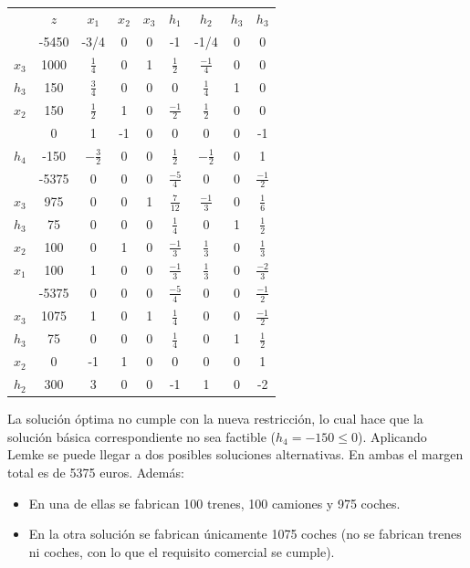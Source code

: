 \begin{enumerate}
    \begin{center}
    \begin{tabular}{c|c|ccccccc|}
      & $z$ & $x_1$ & $x_2$ & $x_3$ & $h_1$ & $h_2$ & $h_3$ & $h_3$\\ 
      & -5450 & -3/4 & 0 & 0 & -1 & -1/4 & 0 & 0\\ 
    \hline
    $x_3$ & 1000  & $\frac{1}{4}$ & 0 & 1 & $\frac{1}{2}$ & $\frac{-1}{4}$ & 0 & 0 \\ 
    $h_3$ & 150  & $\frac{3}{4}$ & 0 & 0 & 0 & $\frac{1}{4}$ & 1 & 0\\ 
    $x_2$ & 150  & $\frac{1}{2}$ & 1 & 0 & $\frac{-1}{2}$ & $\frac{1}{2}$ & 0 & 0\\ 
    \hline
          & 0     & 1          & -1  & 0 & 0 & 0 & 0 & -1\\           
    \hline
    $h_4$ & -150   & $-\frac{3}{2}$ & 0  & 0 & $\frac{1}{2}$ & $-\frac{1}{2}$ & 0 & 1\\ 
    \hline
       & -5375 & 0 & 0 & 0 & $\frac{-5}{4}$ & 0 & 0 & $\frac{-1}{2}$ \\ 
    \hline
    $x_3$ & 975  & 0 & 0 & 1 & $\frac{7}{12}$ & $\frac{-1}{3}$ & 0 & $\frac{1}{6}$\\ 
    $h_3$ & 75  & 0 & 0 & 0 & $\frac{1}{4}$ & 0 & 1 & $\frac{1}{2}$\\ 
    $x_2$ & 100  & 0 & 1 & 0 & $\frac{-1}{3}$ & $\frac{1}{3}$ & 0 & $\frac{1}{3}$\\ 
    $x_1$ & 100  & 1 & 0 & 0 & $\frac{-1}{3}$ & $\frac{1}{3}$ & 0 & $\frac{-2}{3}$\\ 
    \hline
      & -5375 & 0 & 0 & 0 & $\frac{-5}{4}$ & 0 & 0 & $\frac{-1}{2}$ \\ 
    \hline
    $x_3$ & 1075  & 1 & 0 & 1 & $\frac{1}{4}$ & 0 & 0 & $\frac{-1}{2}$\\ 
    $h_3$ & 75  & 0 & 0 & 0 & $\frac{1}{4}$ & 0 & 1 & $\frac{1}{2}$\\ 
    $x_2$ & 0  & -1 & 1 & 0 & 0 & 0 & 0 & 1\\ 
    $h_2$ & 300  & 3 & 0 & 0 & -1 & 1 & 0 & -2\\ 
    \hline
    \end{tabular}
    \end{center}

    La solución óptima no cumple con la nueva restricción, lo cual hace que la solución básica correspondiente no sea factible ($h_4 = -150 \leq 0$). Aplicando Lemke se puede llegar a dos posibles soluciones alternativas. En ambas el margen total es de 5375 euros. Además:
    \begin{itemize}
        \item En una de ellas se fabrican 100 trenes, 100 camiones y 975 coches.
        \item En la otra solución se fabrican únicamente 1075 coches (no se fabrican trenes ni coches, con lo que el requisito comercial se cumple).
    \end{itemize}



    
\end{enumerate}
